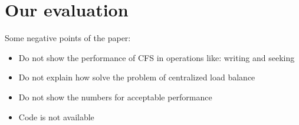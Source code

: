\documentclass{beamer}
\begin{document}
\section{Our evaluation}
	Some negative points of the paper:
	\begin{itemize}
	\item Do not show the performance of CFS in operations like: writing and seeking
	\item Do not explain how solve the problem of centralized load balance
	\item Do not show the numbers for acceptable performance
	\item Code is not available
	\end{itemize}
\end{document}
